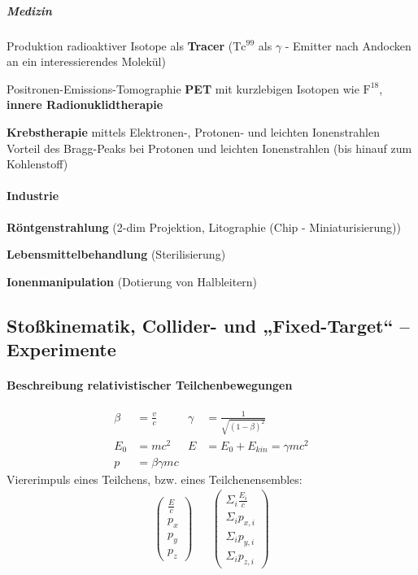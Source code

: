 \documentclass[12pt,DIV=15,a4paper,twoside,draft=false]{scrartcl}
\begin{document}
\subparagraph{Medizin}
Produktion radioaktiver Isotope als \textbf{Tracer} ($\mathrm{Tc^{99}}$ als $γ$ - Emitter nach Andocken an ein interessierendes Molekül)

Positronen-Emissions-Tomographie \textbf{PET} mit kurzlebigen Isotopen wie $\mathrm{F^{18}}$, \textbf{innere Radionuklidtherapie}

\textbf{Krebstherapie} mittels Elektronen-, Protonen- und leichten Ionenstrahlen\\
Vorteil des Bragg-Peaks bei Protonen und leichten Ionenstrahlen (bis hinauf zum Kohlenstoff)

\paragraph{Industrie}
\textbf{Röntgenstrahlung} (2-dim Projektion, Litographie (Chip - Miniaturisierung))

\textbf{Lebensmittelbehandlung} (Sterilisierung)

\textbf{Ionenmanipulation} (Dotierung von Halbleitern)


\subsection[Stoßkinematik]{Stoßkinematik, Collider- und „Fixed-Target“ -- Experimente}
\paragraph{Beschreibung relativistischer Teilchenbewegungen}
\begin{align*}
β &= \frac{v}{c} & γ &= \frac{1}{\sqrt{(1-β)^2}}\\
E_0 &= mc^2 & E &= E_0 + E_{kin} = γmc^2\\
p &= βγmc
\end{align*}
Viererimpuls eines Teilchens, bzw. eines Teilchenensembles:
\begin{align*}
\begin{pmatrix}
\frac{E}{c} \\ p_x\\ p_y\\ p_z
\end{pmatrix}
 && 
\begin{pmatrix}
Σ_i \frac{E_i}{c} \\ Σ_i p_{x,i}\\ Σ_i p_{y,i}\\ Σ_i p_{z,i}
\end{pmatrix}
\end{align*}
\end{document}

